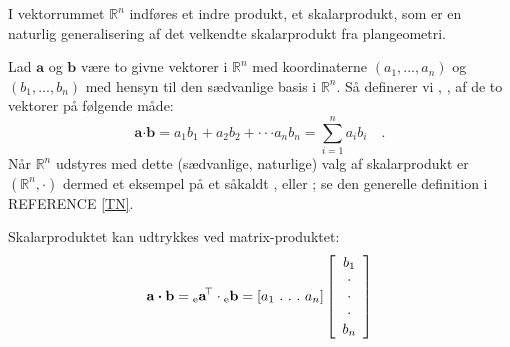 I vektorrummet $\mathbb{R}^{n}$ indføres et indre produkt, et skalarprodukt,  som er en naturlig generalisering af det velkendte skalarprodukt fra plangeometri.

\begin{definition}
Lad $\mathbf{a}$ og $\mathbf{b}$ være to givne vektorer i $\mathbb{R}^{n}$ med koordinaterne $(a_{1}, . . . , a_{n})$ og $(b_{1}, . . . , b_{n})$ med hensyn til den sædvanlige basis i $\mathbb{R}^{n}$. Så definerer vi , , af de to vektorer på følgende måde:
\begin{equation}
\mathbf{a} {\bm{\cdot}} \mathbf{b} =  a_{1}b_{1} + a_{2}b_{2} + \cdot \cdot \cdot a_{n}b_{n} = \sum_{i=1}^{n}a_{i}b_{i} \quad .
\end{equation}
Når $\mathbb{R}^{n}$ udstyres med dette (sædvanlige, naturlige) valg af skalarprodukt er $(\mathbb{R}^{n}, \mathbf{\cdot})$ dermed et eksempel på et såkaldt , eller ; se den generelle definition i REFERENCE \ref{TN}.
\end{definition}

\begin{think}
Skalarproduktet kan udtrykkes ved matrix-produktet:
\begin{equation}
\mathbf{a} \bm{\cdot} \mathbf{b} = {_{\rm{e}}\mathbf{a}}\hspace*{-.6mm}^{\top} \cdot {_{\rm{e}}\mathbf{b}} = [a_{1} \, \, . \, \, . \, \, . \, \, a_{n}] \left[
                                                                                          \begin{array}{c}
                                                                                            b_{1} \\
                                                                                            \cdot \\
                                                                                            \cdot \\
                                                                                            \cdot \\
                                                                                            b_{n} \\
                                                                                          \end{array}
                                                                                        \right]
\end{equation}
\end{think}

